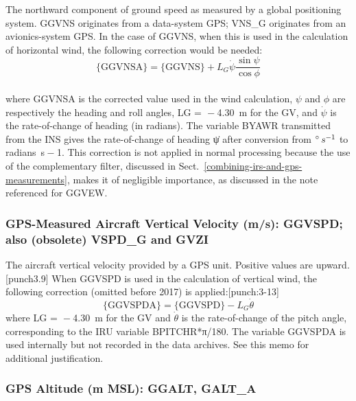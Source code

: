 \documentclass[
  english,
]{book}
\begin{document}
The northward component of ground speed as measured by a global positioning system. GGVNS originates from a data-system GPS; VNS\_G originates from an avionics-system GPS. In the case of GGVNS, when this is used in the calculation of horizontal wind, the following correction would be needed:
\begin{equation}
\mathrm{\{GGVNSA\}} = \mathrm{\{GGVNS\}}+L_{G}\dot{\psi}\frac{\sin\psi}{\cos\phi}
\label{eq:GGVNSA}
\end{equation}\\
where GGVNSA is the corrected value used in the wind calculation, \(\psi\) and \(\phi\) are respectively the heading and roll angles, {LG =  − 4.30}~m for the GV, and \(\dot{\psi}\) is the rate-of-change of heading (in radians). The variable BYAWR transmitted from the INS gives the rate-of-change of heading {ψ̇} after conversion from {\(^{\circ}\thinspace s^{-1}\)} to radians~{s − 1}. This correction is not applied in normal processing because the use of the complementary filter, discussed in Sect.~\ref{combining-irs-and-gps-measurements}, makes it of negligible importance, as discussed in the note referenced for GGVEW.

\hypertarget{ggvspd}{%
\subsubsection*{GPS-Measured Aircraft Vertical Velocity (m/s): GGVSPD; also (obsolete) VSPD\_G and GVZI}\label{ggvspd}}

The aircraft vertical velocity provided by a GPS unit. Positive values are upward.\protect\hypertarget{punch3.9}{}{{[}punch3.9{]}} When GGVSPD is used in the calculation of vertical wind, the following correction (omitted before 2017) is applied:\protect\hypertarget{punch:3-13}{}{{[}punch:3-13{]}}
\begin{equation}
\mathrm{\{GGVSPDA\}} = \mathrm{\{GGVSPD\}}-L_{G}\dot{\theta}
\label{eq:GGVSPDA}
\end{equation}
where {LG =  − 4.30}~m for the GV and \(\dot{\theta}\) is the rate-of-change of the pitch angle, corresponding to the IRU variable BPITCHR*{π}/180. The variable GGVSPDA is used internally but not recorded in the data archives. See this memo for additional justification.

\hypertarget{ggalt}{%
\subsubsection*{GPS Altitude (m MSL): GGALT, GALT\_A}\label{ggalt}}
\end{document}
